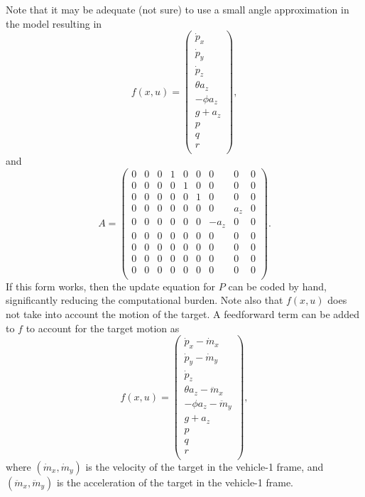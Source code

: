 {Note that it may be adequate (not sure) to use a small angle
approximation in the model resulting in
\[
f(x,u) = \begin{pmatrix}
    \dot{p}_x \\
    \dot{p}_y  \\
    \dot{p}_z \\
    \theta a_z \\
    -\phi a_z\\
    g + a_z \\
    p  \\
    q \\
    r \\
    \end{pmatrix},
\]
and
\[
A = \begin{pmatrix}
    0 & 0 & 0 & 1 & 0 & 0 & 0 & 0 & 0 \\
    0 & 0 & 0 & 0 & 1 & 0 & 0 & 0 & 0 \\
    0 & 0 & 0 & 0 & 0 & 1 & 0 & 0 & 0 \\
    0 & 0 & 0 & 0 & 0 & 0 & 0 & a_z & 0 \\
    0 & 0 & 0 & 0 & 0 & 0 & -a_z & 0 & 0 \\
    0 & 0 & 0 & 0 & 0 & 0 & 0 & 0 & 0 \\
    0 & 0 & 0 & 0 & 0 & 0 & 0 & 0 & 0 \\
    0 & 0 & 0 & 0 & 0 & 0 & 0 & 0 & 0 \\
    0 & 0 & 0 & 0 & 0 & 0 & 0 & 0 & 0 \\
\end{pmatrix}.
\]
If this form works, then the update equation for $P$ can be coded by
hand, significantly reducing the computational burden. Note also
that $f(x,u)$ does not take into account the motion of the target. A
feedforward term can be added to $f$ to account for the target
motion as
\[
f(x,u) = \begin{pmatrix}
    \dot{p}_x - \dot{m}_x \\
    \dot{p}_y - \dot{m}_y \\
    \dot{p}_z \\
    \theta a_z - \ddot{m}_x \\
    -\phi a_z - \ddot{m}_y \\
    g + a_z \\
    p  \\
    q \\
    r \\
    \end{pmatrix},
\]
where $(\dot{m}_x, \dot{m}_y)$ is the velocity of the target in the
vehicle-1 frame, and $(\ddot{m}_x, \ddot{m}_y)$ is the acceleration
of the target in the vehicle-1 frame.


}
